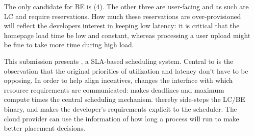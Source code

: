 The only candidate for BE is (4). The other three are user-facing and as such
are LC and require reservations. How much these reservations are
over-provisioned will reflect the developers interest in keeping low latency: it
is critical that the homepage load time be low and constant, whereas processing
a user upload might be fine to take more time during high load.

This submission presents \textit{\sysname}, a SLA-based scheduling system.
Central to \sysname{} is the observation that the original priorities of
utilization and latency don't have to be opposing. In order to help align
incentives, \sysname{} changes the interface with which resource requirements
are communicated: \sysname{} makes deadlines and maximum compute times the
central scheduling mechanism. \sysname{} thereby side-steps the LC/BE binary,
and makes the developer's requirements explicit to the scheduler. The cloud
provider can use the information of how long a process will run to make better
placement decisions.
